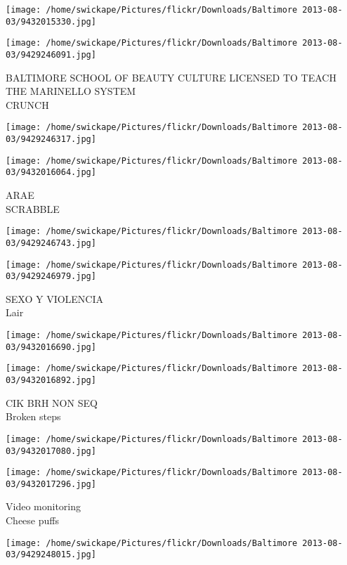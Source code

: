 \documentclass[10pt,letterpaper]{article}
\begin{document}
\texttt{[image: /home/swickape/Pictures/flickr/Downloads/Baltimore 2013-08-03/9432015330.jpg]}

\vspace{0.25in}
\texttt{[image: /home/swickape/Pictures/flickr/Downloads/Baltimore 2013-08-03/9429246091.jpg]}

BALTIMORE SCHOOL OF BEAUTY CULTURE LICENSED TO TEACH THE MARINELLO SYSTEM\\
CRUNCH
\pagebreak

\texttt{[image: /home/swickape/Pictures/flickr/Downloads/Baltimore 2013-08-03/9429246317.jpg]}

\vspace{0.25in}
\texttt{[image: /home/swickape/Pictures/flickr/Downloads/Baltimore 2013-08-03/9432016064.jpg]}

ARAE\\
SCRABBLE
\pagebreak

\texttt{[image: /home/swickape/Pictures/flickr/Downloads/Baltimore 2013-08-03/9429246743.jpg]}

\vspace{0.25in}
\texttt{[image: /home/swickape/Pictures/flickr/Downloads/Baltimore 2013-08-03/9429246979.jpg]}

SEXO Y VIOLENCIA\\
Lair
\pagebreak

\texttt{[image: /home/swickape/Pictures/flickr/Downloads/Baltimore 2013-08-03/9432016690.jpg]}

\vspace{0.25in}
\texttt{[image: /home/swickape/Pictures/flickr/Downloads/Baltimore 2013-08-03/9432016892.jpg]}

CIK BRH NON SEQ\\
Broken steps
\pagebreak

\texttt{[image: /home/swickape/Pictures/flickr/Downloads/Baltimore 2013-08-03/9432017080.jpg]}

\vspace{0.25in}
\texttt{[image: /home/swickape/Pictures/flickr/Downloads/Baltimore 2013-08-03/9432017296.jpg]}

Video monitoring\\
Cheese puffs
\pagebreak

\texttt{[image: /home/swickape/Pictures/flickr/Downloads/Baltimore 2013-08-03/9429248015.jpg]}
\end{document}
